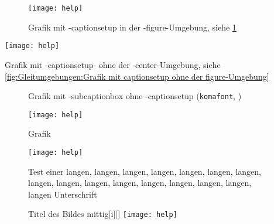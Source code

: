 \begin{figure}%
	\texttt{[image: help]}%
	\caption{Grafik mit -captionsetup in der -figure-Umgebung, siehe \ref{fig:Gleitumgebungen:Grafik mit captionsetup in der figure-Umgebung}}%
	\label{fig:Gleitumgebungen:Grafik mit captionsetup in der figure-Umgebung}%
\end{figure}%
%
{\captionsetup{type=figure,justification=centering}%
	\texttt{[image: help]}%
	\caption{Grafik mit -captionsetup- ohne der -center-Umgebung, siehe \ref{fig:Gleitumgebungen:Grafik mit captionsetup ohne der figure-Umgebung}}%
	\label{fig:Gleitumgebungen:Grafik mit captionsetup ohne der figure-Umgebung}%
}%
%
\begin{figure}%
\captionsetup{justification=centering}%
%
\hfill%
%
\hfill%
%
\hfill%
%
\caption{Grafik mit -subcaptionbox ohne -captionsetup (\texttt{komafont}, \cite{LabenbacherTeX})}%
\label{fig:Gleitumgebungen:Grafik mit subcaptionbox ohne captionsetup (Standard: komafont)}%
\end{figure}%
%
\setcounter{TUMcthelp}{1}%
{%
	\begin{figure}%
		\texttt{[image: help]}%
		\caption{Grafik \theTUMcthelp{}}%
	\end{figure}%
	\lipsum[1-1]%
}%
\lipsum[1-1]
\begin{figure}%
	\texttt{[image: help]}%
	\caption{Test einer langen, langen, langen, langen, langen, langen, langen, langen, langen, langen, langen, langen, langen, langen, langen, langen Unterschrift }%
\end{figure}%
\lipsum[1-1]
\begin{figure}%
	\begingroup%
	\begin{captionbeside}{Titel des Bildes mittig}[i][\linewidth]%
		\texttt{[image: help]}
	\end{captionbeside}\label{fig:Gleitumgebungen:Titel des Bildes mittig}%
	\endgroup%
\end{figure}

